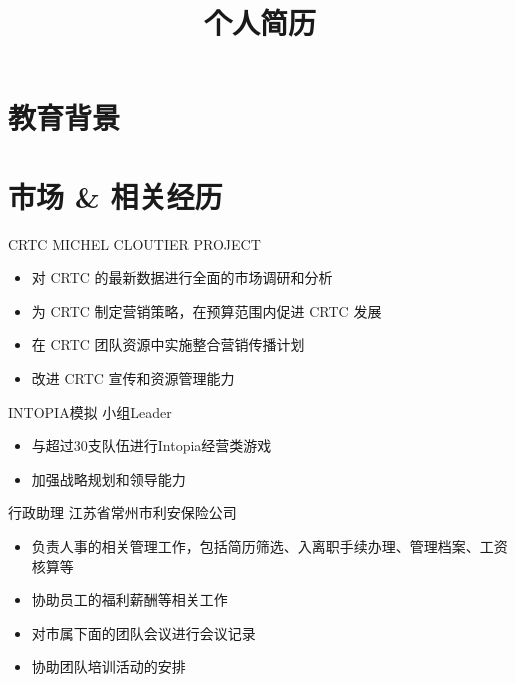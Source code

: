 \documentclass[11pt,a4paper]{moderncv}
\title{个人简历}                      %
\begin{document}
\maketitle

\section{教育背景}


\section{市场 \& 相关经历}
\renewcommand{\baselinestretch}{1.2}
{CRTC MICHEL CLOUTIER PROJECT}
{}
{}{}
{
\begin{itemize}
\item 对 CRTC 的最新数据进行全面的市场调研和分析
\item 为 CRTC 制定营销策略，在预算范围内促进 CRTC 发展
\item 在 CRTC 团队资源中实施整合营销传播计划
\item 改进 CRTC 宣传和资源管理能力
\end{itemize}
}

{INTOPIA模拟}
{}
{}{小组Leader}
{
\begin{itemize}
\item 与超过30支队伍进行Intopia经营类游戏
\item 加强战略规划和领导能力
\end{itemize}
}

{行政助理}
{江苏省常州市利安保险公司}
{}{}
{
\begin{itemize}
\item 负责人事的相关管理工作，包括简历筛选、入离职手续办理、管理档案、工资核算等
\item 协助员工的福利薪酬等相关工作
\item 对市属下面的团队会议进行会议记录
\item 协助团队培训活动的安排
\end{itemize}
}
\end{document}
